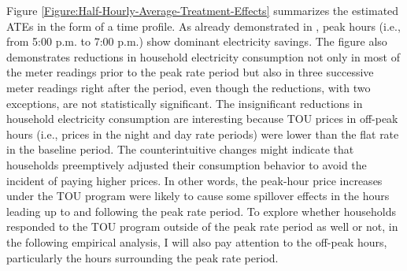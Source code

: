 Figure \ref{Figure:Half-Hourly-Average-Treatment-Effects} summarizes the estimated ATEs in the form of a time profile. As already demonstrated in \cite{Peaking-Interest:How-Awareness-Drives-the-Effectiveness-of-Time-of-Use-Electricity-Pricing_Prest_2020}, peak hours (i.e., from 5:00 p.m. to 7:00 p.m.) show dominant electricity savings. The figure also demonstrates reductions in household electricity consumption not only in most of the meter readings prior to the peak rate period but also in three successive meter readings right after the period, even though the reductions, with two exceptions, are not statistically significant. The insignificant reductions in household electricity consumption are interesting because TOU prices in off-peak hours (i.e., prices in the night and day rate periods) were lower than the flat rate in the baseline period. The counterintuitive changes might indicate that households preemptively adjusted their consumption behavior to avoid the incident of paying higher prices. In other words, the peak-hour price increases under the TOU program were likely to cause some spillover effects in the hours leading up to and following the peak rate period. To explore whether households responded to the TOU program outside of the peak rate period as well or not, in the following empirical analysis, I will also pay attention to the off-peak hours, particularly the hours surrounding the peak rate period.

